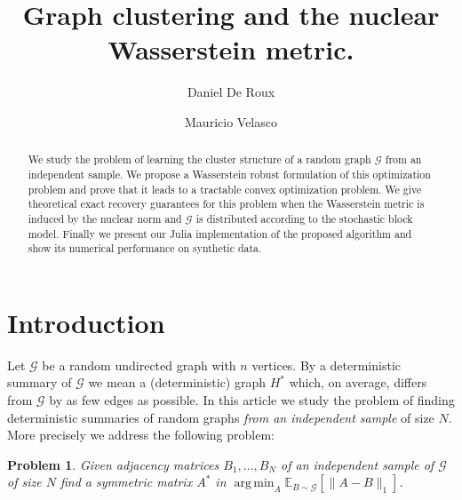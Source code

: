 \documentclass[12pt]{amsart}
\newtheorem{problem}[lemma]{Problem}
\theoremstyle{remark}
\DeclareMathOperator*{\argmin}{arg\,min}
\newcommand{\EE}{\mathbb{E}}
\newcommand{\grG}{{\mathcal{G}}}
\begin{document}
\author{Daniel De Roux}
\address{
Departamento de matem\'aticas\\
Universidad de los Andes\\
Carrera $1^{\rm ra}\#18A-12$\\ 
Bogot\'a, Colombia
}

\author{Mauricio Velasco}
\address{
Departamento de matem\'aticas\\
Universidad de los Andes\\
Carrera $1^{\rm ra}\#18A-12$\\ 
Bogot\'a, Colombia
}


\begin{abstract} We study the problem of learning the cluster structure of a random graph $\grG$ from an independent sample. We propose a Wasserstein robust formulation of this optimization problem and prove that it leads to a tractable convex optimization problem. We give theoretical exact recovery guarantees for this problem when the Wasserstein metric is induced by the nuclear norm and $\grG$ is distributed according to the stochastic block model. Finally we present our Julia implementation of the proposed algorithm and show its numerical performance on synthetic data.
\end{abstract} 

\title{Graph clustering and the nuclear Wasserstein metric.}
\maketitle

\section{Introduction}


Let $\grG$ be a random undirected graph with $n$ vertices. By a deterministic summary of $\grG$ we mean a (deterministic) graph $H^*$ which, on average, differs from $\grG$ by as few edges as possible. In this article we study the problem of finding deterministic summaries of random graphs {\it from an independent sample} of size $N$. More precisely we address the following problem:

\begin{problem}\label{Prob} Given adjacency matrices $B_1,\dots, B_N$ of an independent sample of $\grG$ of size $N$ find a symmetric matrix $A^*$ in $\argmin_A \EE_{B\sim \grG}[\|A-B\|_1]$. 
\end{problem}
\end{document}
